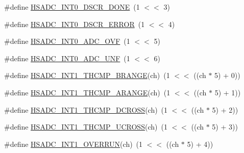 \begin{DoxyCompactItemize}
\item 
\#define \hyperlink{group___h_s_a_d_c__18_x_x__43_x_x_ga829571c11e7c8e7a44966820acffcaa3}{H\+S\+A\+D\+C\+\_\+\+I\+N\+T0\+\_\+\+D\+S\+C\+R\+\_\+\+D\+O\+NE}~(1 $<$$<$ 3)
\item 
\#define \hyperlink{group___h_s_a_d_c__18_x_x__43_x_x_ga40cb66b32360ce6cbd98aa0ce3de31a5}{H\+S\+A\+D\+C\+\_\+\+I\+N\+T0\+\_\+\+D\+S\+C\+R\+\_\+\+E\+R\+R\+OR}~(1 $<$$<$ 4)
\item 
\#define \hyperlink{group___h_s_a_d_c__18_x_x__43_x_x_ga8bb38fa225bf592f805b7979459cbfc2}{H\+S\+A\+D\+C\+\_\+\+I\+N\+T0\+\_\+\+A\+D\+C\+\_\+\+O\+VF}~(1 $<$$<$ 5)
\item 
\#define \hyperlink{group___h_s_a_d_c__18_x_x__43_x_x_gad015ea52167f05024a42c4be5b8deac3}{H\+S\+A\+D\+C\+\_\+\+I\+N\+T0\+\_\+\+A\+D\+C\+\_\+\+U\+NF}~(1 $<$$<$ 6)
\item 
\#define \hyperlink{group___h_s_a_d_c__18_x_x__43_x_x_ga2fdf9432486e0e74575f360a8280923d}{H\+S\+A\+D\+C\+\_\+\+I\+N\+T1\+\_\+\+T\+H\+C\+M\+P\+\_\+\+B\+R\+A\+N\+GE}(ch)~(1 $<$$<$ ((ch $\ast$ 5) + 0))
\item 
\#define \hyperlink{group___h_s_a_d_c__18_x_x__43_x_x_ga55155119335413cd579ff9da9888b209}{H\+S\+A\+D\+C\+\_\+\+I\+N\+T1\+\_\+\+T\+H\+C\+M\+P\+\_\+\+A\+R\+A\+N\+GE}(ch)~(1 $<$$<$ ((ch $\ast$ 5) + 1))
\item 
\#define \hyperlink{group___h_s_a_d_c__18_x_x__43_x_x_ga7ec226dc9dc901248ee36696803097b2}{H\+S\+A\+D\+C\+\_\+\+I\+N\+T1\+\_\+\+T\+H\+C\+M\+P\+\_\+\+D\+C\+R\+O\+SS}(ch)~(1 $<$$<$ ((ch $\ast$ 5) + 2))
\item 
\#define \hyperlink{group___h_s_a_d_c__18_x_x__43_x_x_ga63d87a4bacb160ac3e6e68f21daf8580}{H\+S\+A\+D\+C\+\_\+\+I\+N\+T1\+\_\+\+T\+H\+C\+M\+P\+\_\+\+U\+C\+R\+O\+SS}(ch)~(1 $<$$<$ ((ch $\ast$ 5) + 3))
\item 
\#define \hyperlink{group___h_s_a_d_c__18_x_x__43_x_x_gad4bd824de161be1ab9a6aa9860bc2d74}{H\+S\+A\+D\+C\+\_\+\+I\+N\+T1\+\_\+\+O\+V\+E\+R\+R\+UN}(ch)~(1 $<$$<$ ((ch $\ast$ 5) + 4))
\end{DoxyCompactItemize}
